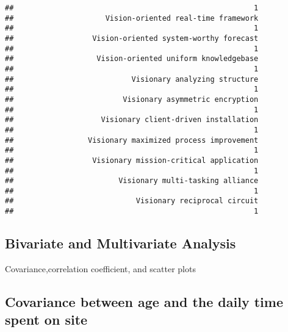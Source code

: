 \documentclass[
]{article}
\newenvironment{Shaded}{\begin{snugshade}}{\end{snugshade}}
\newcommand{\CommentTok}[1]{\textcolor[rgb]{0.56,0.35,0.01}{\textit{#1}}}
\newcommand{\DocumentationTok}[1]{\textcolor[rgb]{0.56,0.35,0.01}{\textbf{\textit{#1}}}}
\newcommand{\FunctionTok}[1]{\textcolor[rgb]{0.00,0.00,0.00}{#1}}
\newcommand{\NormalTok}[1]{#1}
\newcommand{\OtherTok}[1]{\textcolor[rgb]{0.56,0.35,0.01}{#1}}
\newcommand{\SpecialCharTok}[1]{\textcolor[rgb]{0.00,0.00,0.00}{#1}}
\begin{document}
\begin{verbatim}
##                                                       1 
##                     Vision-oriented real-time framework 
##                                                       1 
##                  Vision-oriented system-worthy forecast 
##                                                       1 
##                   Vision-oriented uniform knowledgebase 
##                                                       1 
##                           Visionary analyzing structure 
##                                                       1 
##                         Visionary asymmetric encryption 
##                                                       1 
##                    Visionary client-driven installation 
##                                                       1 
##                 Visionary maximized process improvement 
##                                                       1 
##                  Visionary mission-critical application 
##                                                       1 
##                        Visionary multi-tasking alliance 
##                                                       1 
##                            Visionary reciprocal circuit 
##                                                       1
\end{verbatim}

\hypertarget{bivariate-and-multivariate-analysis}{%
\subsection{Bivariate and Multivariate
Analysis}\label{bivariate-and-multivariate-analysis}}

Covariance,correlation coefficient, and scatter plots

\hypertarget{covariance-between-age-and-the-daily-time-spent-on-site}{%
\subsection{Covariance between age and the daily time spent on
site}\label{covariance-between-age-and-the-daily-time-spent-on-site}}

\begin{Shaded}
\end{Shaded}
\end{document}
